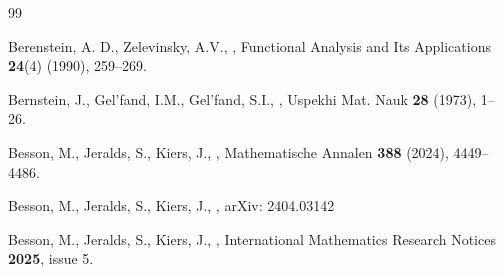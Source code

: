 \documentclass[12pt,reqno]{amsart}
\theoremstyle{definition}
\begin{document}

\begin{thebibliography}{99}
	
	
	 
	
	Berenstein, A. D., Zelevinsky, A.V.,
	,
	\newblock Functional Analysis and Its Applications {\bf 24}(4) (1990), 259--269.
	
	Bernstein, J., Gel'fand, I.M., Gel'fand, S.I.,
	,
	\newblock Uspekhi Mat. Nauk {\bf 28} (1973), 1--26.
	

	
	
	
	
	
	Besson, M., Jeralds, S., Kiers, J.,
	,
	\newblock Mathematische Annalen {\bf 388} (2024), 4449--4486.
	
	
	Besson, M., Jeralds, S., Kiers, J.,
	,
	arXiv: 2404.03142
	
	
	Besson, M., Jeralds, S., Kiers, J.,
	,
	\newblock International Mathematics Research Notices {\bf 2025}, issue 5. 
	
	
	
	


\end{thebibliography}
\end{document}
